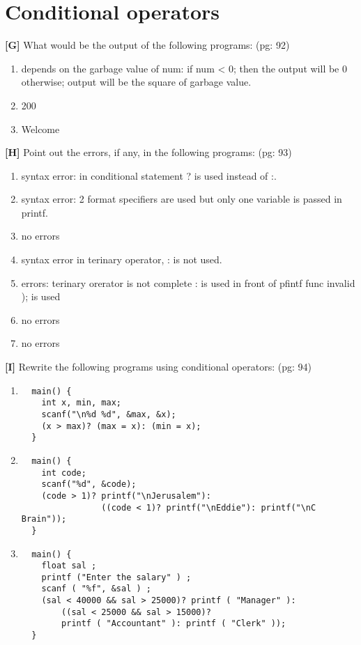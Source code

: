 \documentclass{report}
\begin{document}
\section*{Conditional operators}
\textbf{[G]} What would be the output of the following programs: (pg: 92)
\begin{enumerate}
    \renewcommand{\labelenumi}{\alph{enumi}}
  \item depends on the garbage value of num:
    \subitem if num < 0; then the output will be 0
    \subitem otherwise; output will be the square of garbage value.
  \item 200
  \item Welcome
\end{enumerate}
\textbf{[H]} Point out the errors, if any, in the following programs: (pg: 93)
\begin{enumerate}
    \renewcommand{\labelenumi}{\alph{enumi}}
  \item syntax error: in conditional statement ? is used instead of :.
  \item syntax error: 2 format specifiers are used but only one variable is passed in printf.
  \item no errors
  \item syntax error in terinary operator, : is not used.
  \item errors:
    \subitem terinary orerator is not complete
    \subitem : is used in front of pfintf func
    \subitem invalid ); is used
  \item no errors
  \item no errors
\end{enumerate}
\textbf{[I]} Rewrite the following programs using conditional operators: (pg: 94)
\begin{enumerate}
    \renewcommand{\labelenumi}{\alph{enumi}}
  \item \begin{verbatim}
  main() {
    int x, min, max;
    scanf("\n%d %d", &max, &x);
    (x > max)? (max = x): (min = x);
  }
  \end{verbatim}
  \item \begin{verbatim}
  main() {
    int code;
    scanf("%d", &code);
    (code > 1)? printf("\nJerusalem"): 
                ((code < 1)? printf("\nEddie"): printf("\nC Brain"));
  }
  \end{verbatim}
  \item \begin{verbatim}
  main() {
    float sal ; 
    printf ("Enter the salary" ) ; 
    scanf ( "%f", &sal ) ; 
    (sal < 40000 && sal > 25000)? printf ( "Manager" ):
        ((sal < 25000 && sal > 15000)? 
        printf ( "Accountant" ): printf ( "Clerk" )); 
  }
  \end{verbatim}
    
\end{enumerate}
\end{document}
